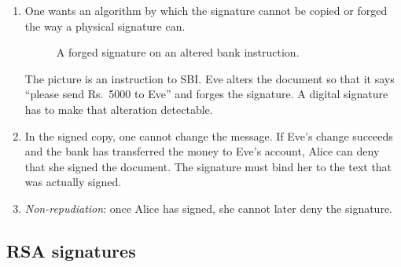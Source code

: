\begin{enumerate}[leftmargin=1.6em]
    \item One wants an algorithm by which the signature cannot be copied
    or forged the way a physical signature can.

    \begin{figure}[H]
    \centering
    \caption{A forged signature on an altered bank instruction.}
    \end{figure}

    The picture is an instruction to SBI. Eve alters the document so that
    it says ``please send Rs.\ 5000 to Eve'' and forges the signature. A
    digital signature has to make that alteration detectable.

    \item In the signed copy, one cannot change the message. If Eve's
    change succeeds and the bank has transferred the money to Eve's
    account, Alice can deny that she signed the document. The signature
    must bind her to the text that was actually signed.

    \item \emph{Non-repudiation}: once Alice has signed, she cannot later
    deny the signature.
\end{enumerate}

\subsection{RSA signatures}

